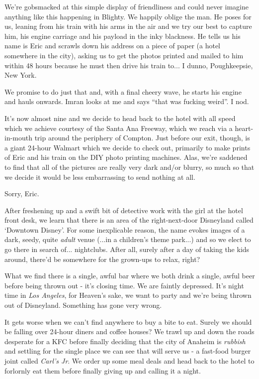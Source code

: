 \documentclass[a5paper,titlepage,11pt]{book}
\begin{document}
We're gobsmacked at this simple display of friendliness and could never imagine anything like this happening in Blighty.  We happily oblige the man.  He poses for us, leaning from his train with his arms in the air and we try our best to capture him, his engine carriage and his payload in the inky blackness.  He tells us his name is Eric and scrawls down his address on a piece of paper (a hotel somewhere in the city), asking us to get the photos printed and mailed to him within 48 hours because he must then drive his train to... I dunno, Poughkeepsie, New York.

We promise to do just that and, with a final cheery wave, he starts his engine and hauls onwards.  Imran looks at me and says ``that was fucking weird''.  I nod.

It's now almost nine and we decide to head back to the hotel with all speed which we achieve courtesy of the Santa Ana Freeway, which we reach via a heart-in-mouth trip around the periphery of Compton.  Just before our exit, though, is a giant 24-hour Walmart which we decide to check out, primarily to make prints of Eric and his train on the DIY photo printing machines.  Alas, we're saddened to find that all of the pictures are really very dark and/or blurry, so much so that we decide it would be less embarrassing to send nothing at all.

Sorry, Eric.

After freshening up and a swift bit of detective work with the girl at the hotel front desk, we learn that there is an area of the right-next-door Disneyland called `Downtown Disney'.  For some inexplicable reason, the name evokes images of a dark, seedy, quite \emph{adult} venue (...in a children's theme park...) and so we elect to go there in search of... nightclubs.  After all, surely after a day of taking the kids around, there'd be somewhere for the grown-ups to relax, right?

What we find there is a single, awful bar where we both drink a single, awful beer before being thrown out - it's closing time.  We are faintly depressed.  It's night time in \emph{Los Angeles}, for Heaven's sake, we want to party and we're being thrown out of Disneyland.  Something has gone very wrong.

It gets worse when we can't find anywhere to buy a bite to eat.  Surely we should be falling over 24-hour diners and coffee houses?  We trawl up and down the roads desperate for a KFC before finally deciding that the city of Anaheim is \emph{rubbish} and settling for the single place we can see that will serve us - a fast-food burger joint called \emph{Carl's Jr}.  We order up some meal deals and head back to the hotel to forlornly eat them before finally giving up and calling it a night.
\end{document}
